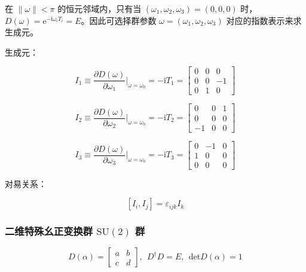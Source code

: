 在 $\lVert\omega\rVert<\pi$ 的恒元邻域内，只有当 $\left(\omega_1,\omega_2,\omega_3\right)=\left(0,0,0\right)$ 时，$D\left(\omega\right)=\mathrm{e}^{-\mathrm{i}\omega_i T_i}=E$。因此可选择群参数 $\omega=\left(\omega_1,\omega_2,\omega_3\right)$ 对应的指数表示来求生成元。

生成元：

\begin{equation}
I_1
\equiv \frac{\partial D\left(\omega\right) }{\partial \omega_1 }\bigg|_{\omega = \omega_0}
=-\mathrm{i}T_1
=\begin{bmatrix}
0 &0 &0 \\
0 &0 &-1 \\
0 &1 &0
\end{bmatrix}
\end{equation}

\begin{equation}
I_2
\equiv \frac{\partial D\left(\omega\right) }{\partial \omega_2 }\bigg|_{\omega = \omega_0}
=-\mathrm{i}T_2
=\begin{bmatrix}
0 &0 &1 \\
0 &0 &0 \\
-1 &0 &0
\end{bmatrix}
\end{equation}

\begin{equation}
I_3
\equiv \frac{\partial D\left(\omega\right) }{\partial \omega_3 }\bigg|_{\omega = \omega_0}
=-\mathrm{i}T_3
=\begin{bmatrix}
0 &-1 &0 \\
1 &0 &0 \\
0 &0 &0
\end{bmatrix}
\end{equation}

对易关系：

\begin{equation}
\left[I_i,I_j\right]
=\varepsilon_{ijk} I_k
\end{equation}

\subsubsection*{\texorpdfstring{二维特殊幺正变换群 $\mathrm{SU}\left(2\right)$ 群}{二维特殊幺正变换群 SU(2) 群}}

\begin{equation}
D\left(\alpha\right) 
=\begin{bmatrix}
a &b \\
c &d
\end{bmatrix},~~
D^\dagger D = E,~~
\mathrm{det} D\left(\alpha\right) = 1
\end{equation}

